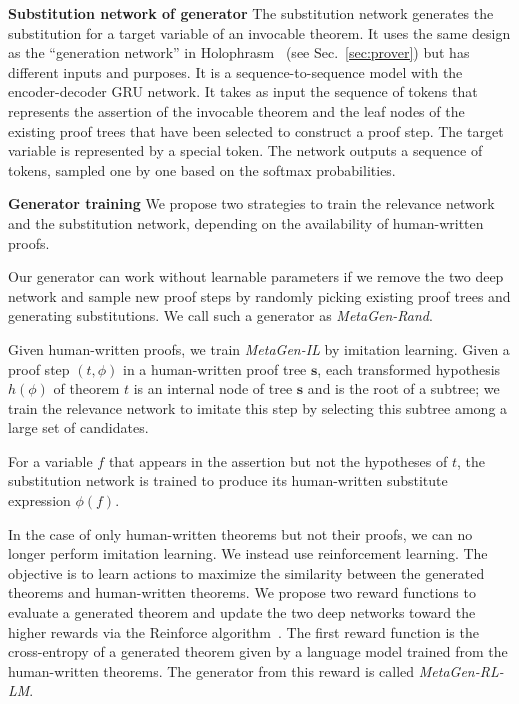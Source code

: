 \documentclass{article}
\begin{document}
\noindent\textbf{Substitution network of generator}
The substitution network generates the substitution for a target variable
of an invocable theorem. It uses the same design as the ``generation network'' in Holophrasm~\cite{whalen2016holophrasm} (see Sec.~\ref{sec:prover}) but has different inputs and purposes. 
It is a sequence-to-sequence model with the encoder-decoder GRU  network.
It takes as input the sequence of tokens that represents the assertion of the invocable theorem 
and the leaf nodes of the existing proof trees that have been selected to construct a proof step.
The target variable
is represented by a special token. 
The network outputs a sequence of tokens, sampled one by one based on the softmax probabilities. 
 
\noindent\textbf{Generator training}
\label{section:train generator}
We propose two strategies to train
the relevance network and the substitution network,
depending on the availability of human-written proofs. 

Our generator can work without  learnable parameters if we remove
the two deep network and sample new proof steps by randomly picking existing proof trees 
and generating substitutions.
We call such a generator as \emph{MetaGen-Rand}.

Given human-written proofs,
we train \textit{MetaGen-IL} by imitation learning.
Given a proof step $(t,\phi)$ in a human-written proof tree $\mathbf{s}$,
each transformed hypothesis $h(\phi)$ of theorem $t$
 is an internal node of tree $\mathbf{s}$ and is the root of a subtree; we train the relevance network to imitate this step by selecting this subtree among a large set of candidates. 

For a variable $f$ that appears in the assertion but not the hypotheses of $t$, 
the substitution network is trained to produce 
its human-written substitute expression $\phi(f)$.

In the case of only human-written theorems but not their proofs, we can no longer perform imitation learning. We instead use reinforcement learning. The objective is to learn actions to maximize the similarity between the generated theorems and human-written theorems.  
We propose two reward functions to evaluate a generated theorem and  update the two deep networks 
toward the higher rewards via the Reinforce algorithm~\cite{williams1992simple}.
The first reward function is the cross-entropy of a generated theorem given by a language model trained from the human-written theorems. 
The generator from this reward is called \emph{MetaGen-RL-LM}.
\end{document}
